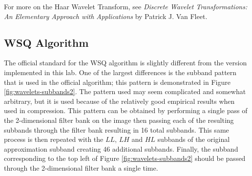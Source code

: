 For more on the Haar Wavelet Transform, see \emph{Discrete Wavelet Transformations: An Elementary Approach with Applications} by Patrick J. Van Fleet.

\subsection*{WSQ Algorithm}
The official standard for the WSQ algorithm is slightly different from the version implemented in this lab.
One of the largest differences is the subband pattern that is used in the official algorithm; this pattern is demonstrated in Figure \ref{fig:wavelets-subbands2}.
The pattern used may seem complicated and somewhat arbitrary, but it is used because of the relatively good empirical results when used in compression.
This pattern can be obtained by performing a single pass of the 2-dimensional filter bank on the image then passing each of the resulting subbands through the filter bank resulting in 16 total subbands.
This same process is then repeated with the $LL$, $LH$ and $HL$ subbands of the original approximation subband creating 46 additional subbands.
Finally, the subband corresponding to the top left of Figure \ref{fig:wavelets-subbands2} should be passed through the 2-dimensional filter bank a single time.

\begin{comment}
We need to calculate the subband pattern found in Figure \ref{fig:wavelets-subbands2}.
This subband pattern is somewhat arbitrary, but is used because of its empirically good results in compression.
While the pattern may appear complicated at first, we can obtain the required subband coefficients rather easily.
To start, decompose the image into 16 subbands, first by using the \li{dwt2} function to split the image into four subbands, and then applying the function again to each of the four subbands.

Using the function \li{_decompose16} on the fingerprint image, you should now have a grid of 16 subbands.
Next, split each of the three subbands found in the top left corner of the subband grid into 16 additional subbands, in the same way as before.
You now have a grid of $13 + 3(16) = 61$ subbands.

Finally, take the very top left subband, and split this into four additional subbands.
You should have 64 subbands. Place them into a list in the order indicated by the numbers in Figure \ref{fig:wavelets-subbands2}.
\end{comment}

